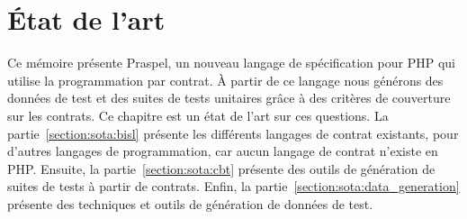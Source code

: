 \chapter{État de l'art}
\label{chapter:state}

\mminitoc

Ce mémoire présente Praspel, un nouveau langage de spécification pour PHP qui
utilise la programmation par contrat. À partir de ce langage nous générons des
données de test et des suites de tests unitaires grâce à des critères de
couverture sur les contrats. Ce chapitre est un état de l'art sur ces questions.
La partie~\ref{section:sota:bisl} présente les différents langages de contrat
existants, pour d'autres langages de programmation, car aucun langage de contrat
n'existe en PHP. Ensuite, la partie~\ref{section:sota:cbt} présente des outils
de génération de suites de tests à partir de contrats. Enfin, la
partie~\ref{section:sota:data_generation} présente des techniques et outils de
génération de données de test.

